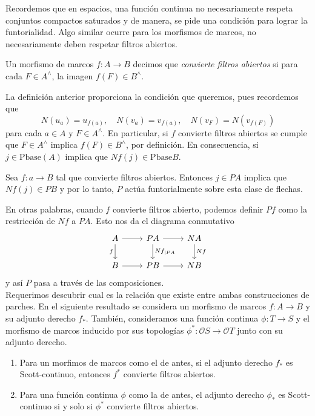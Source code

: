 Recordemos que en espacios, una función continua no necesariamente respeta conjuntos compactos saturados y de manera, se pide una condición para lograr la funtorialidad. Algo similar ocurre para los morfismos de marcos, no necesariamente deben respetar filtros abiertos.

\begin{dfn}\label{Definicion7.2.2}
    Un morfismo de marcos $f\colon A\to B$ decimos que \emph{convierte filtros abiertos} si para cada $F\in A^\wedge$, la imagen $f(F)\in B^\wedge$.
\end{dfn}

La definición anterior proporciona la condición que queremos, pues recordemos que 
\[
N(u_a)=u_{f(a)},\quad N(v_a)=v_{f(a)},\quad N(v_F)=N(v_{f(F)})
\]
para cada $a\in A$ y $F\in A^\wedge$. En particular, si $f$ convierte filtros abiertos se cumple que $F\in A^\wedge$ implica $f(F)\in B^\wedge$, por definición. En consecuencia, si $j\in \mbox{Pbase}(A)$ implica que $Nf(j)\in \mbox{Pbase}B$.

\begin{lem}\label{Lema7.2.3}
    Sea $f\colon a\to B$ tal que convierte filtros abiertos. Entonces $j\in PA$ implica que $Nf(j)\in PB$ y por lo tanto, $P$ actúa funtorialmente sobre esta clase de flechas.
\end{lem}

En otras palabras, cuando $f$ convierte filtros abierto, podemos definir $Pf$ como la restricción de $Nf$ a $PA$. Esto nos da el diagrama conmutativo
\[\begin{tikzcd}
	A & PA & NA \\
	B & PB & NB
	\arrow[from=1-1, to=1-2]
	\arrow["f"', from=1-1, to=2-1]
	\arrow[from=1-2, to=1-3]
	\arrow["{Nf_{\mid PA}}", from=1-2, to=2-2]
	\arrow["Nf", from=1-3, to=2-3]
	\arrow[from=2-1, to=2-2]
	\arrow[from=2-2, to=2-3]
\end{tikzcd}\]
y así $P$ pasa a través de las composiciones.\\

Requerimos descubrir cual es la relación que existe entre ambas construcciones de parches. En el siguiente resultado se considera un morfismo de marcos $f\colon A\to B$ y su adjunto derecho $f_*$. También, consideramos una función continua $\phi\colon T\to S$ y el morfismo de marcos inducido por sus topologías $\phi^*\colon\mathcal{O}S\to \mathcal{O}T$ junto con su adjunto derecho.\\

\begin{thm}\label{Teorema7.2.4}
    \begin{enumerate}
        \item Para un morfimos de marcos como el de antes, si el adjunto derecho $f_*$ es Scott-continuo, entonces $f^*$ convierte filtros abiertos.
        \item Para una función continua $\phi$ como la de antes, el adjunto derecho $\phi_*$ es Scott-continuo si y solo si $\phi^*$ convierte filtros abiertos.
    \end{enumerate}
\end{thm}

